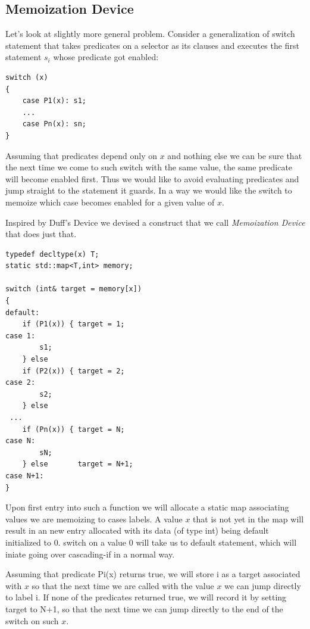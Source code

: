 \documentclass[preprint]{sigplanconf}
\begin{document}
\subsection{Memoization Device}

Let's look at slightly more general problem. Consider a generalization of switch 
statement that takes predicates on a selector as its clauses and executes the 
first statement $s_i$ whose predicate got enabled:

\begin{lstlisting}
switch (x)
{
    case P1(x): s1;
    ...
    case Pn(x): sn;
}
\end{lstlisting}

\noindent
Assuming that predicates depend only on $x$ and nothing else we can be sure that
the next time we come to such switch with the same value, the same predicate 
will become enabled first. Thus we would like to avoid evaluating predicates and 
jump straight to the statement it guards. In a way we would like the switch to 
memoize which case becomes enabled for a given value of $x$. 

Inspired by Duff's Device\cite{Duff} we devised a construct that we call 
\emph{Memoization Device} that does just that.

\begin{lstlisting}
typedef decltype(x) T;
static std::map<T,int> memory;

switch (int& target = memory[x])
{
default:
    if (P1(x)) { target = 1;
case 1:
        s1;
    } else 
    if (P2(x)) { target = 2;
case 2:
        s2;
    } else
 ...
    if (Pn(x)) { target = N;
case N:
        sN;
    } else       target = N+1;
case N+1:
}
\end{lstlisting}

Upon first entry into such a function we will allocate a static map associating 
values we are memoizing to cases labels. A value $x$ that is not yet in the map 
will result in an new entry allocated with its data (of type int) being default 
initialized to 0. switch on a value 0 will take us to default statement, which 
will iniate going over cascading-if in a normal way. 

Assuming that predicate Pi(x) returns true, we will store i as a target 
associated with $x$ so that the next time we are called with the value $x$ we 
can jump directly to label i. If none of the predicates returned true, we will 
record it by setting target to N+1, so that the next time we can jump directly 
to the end of the switch on such $x$. 
\end{document}
